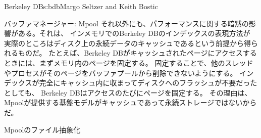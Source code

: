 \begin{aosachapter}{Berkeley DB}{s:bdb}{Margo Seltzer and Keith Bostic}
\begin{aosasect1}{バッファマネージャー: Mpool}
それ以外にも、パフォーマンスに関する暗黙の影響がある。それは、
インメモリでのBerkeley DBのインデックスの表現方法が
実際のところはディスク上の永続データのキャッシュであるという前提から得られるものだ。
たとえば、Berkeley DBがキャッシュされたページにアクセスするときには、まずメモリ内のページを固定する。
固定することで、他のスレッドやプロセスがそのページをバッファプールから削除できないようにする。
インデックスが完全にキャッシュ内に収まってディスクへのフラッシュが不要だったとしても、
Berkeley DBはアクセスのたびにページを固定する。
その理由は、Mpoolが提供する基盤モデルがキャッシュであって永続ストレージではないからだ。

\begin{aosasect2}{Mpoolのファイル抽象化}


\end{aosasect2}
\end{aosasect1}
\end{aosachapter}
